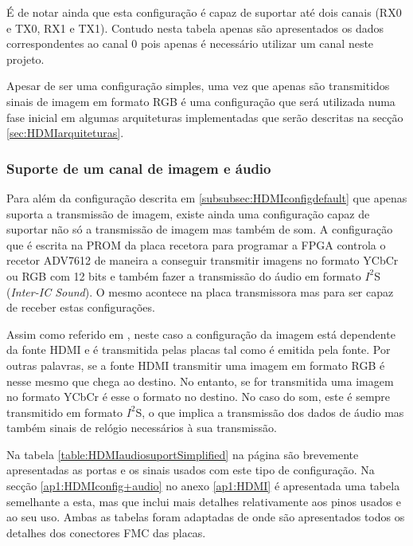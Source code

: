 É de notar ainda que esta configuração é capaz de suportar até dois canais (RX0 e TX0, RX1 e TX1). Contudo nesta tabela apenas são apresentados os dados correspondentes ao canal 0 pois apenas é necessário utilizar um canal neste projeto. 

Apesar de ser uma configuração simples, uma vez que apenas são transmitidos sinais de imagem em formato RGB é uma configuração que será utilizada numa fase inicial em algumas arquiteturas implementadas que serão descritas na secção \ref{sec:HDMIarquiteturas}.

\subsubsection{Suporte de um canal de imagem e áudio} \label {subsubsec:HDMIconfig+audio}

Para além da configuração descrita em \ref{subsubsec:HDMIconfigdefault} que apenas suporta a transmissão de imagem, existe ainda uma configuração capaz de suportar não só a transmissão de imagem mas também de som. A configuração que é escrita na PROM da placa recetora para programar a FPGA controla o recetor ADV7612 de maneira a conseguir transmitir imagens no formato YCbCr ou RGB com 12 bits e também fazer a transmissão do áudio em formato $I^{2}$S (\textit{Inter-IC Sound}). O mesmo acontece na placa transmissora mas para ser capaz de receber estas configurações.

Assim como referido em \cite{R014}, neste caso a configuração da imagem está dependente da fonte HDMI e é transmitida pelas placas tal como é emitida pela fonte. Por outras palavras, se a fonte HDMI transmitir uma imagem em formato RGB é nesse mesmo que chega ao destino. No entanto, se for transmitida uma imagem no formato YCbCr é esse o formato no destino. No caso do som, este é sempre transmitido em formato $I^{2}$S, o que implica a transmissão dos dados de áudio mas também sinais de relógio necessários à sua transmissão.

Na tabela \ref{table:HDMIaudiosuportSimplified} na página \pageref{table:HDMIaudiosuportSimplified} são brevemente apresentadas as portas e os sinais usados com este tipo de configuração. Na secção \ref{ap1:HDMIconfig+audio} no anexo \ref{ap1:HDMI} é apresentada uma tabela semelhante a esta, mas que inclui mais detalhes relativamente aos pinos usados e ao seu uso. Ambas as tabelas foram adaptadas de \cite{R014} onde são apresentados todos os detalhes dos conectores FMC das placas.

